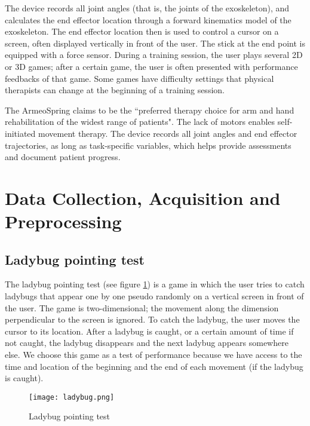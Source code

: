 The device records all joint angles (that is, the joints of the exoskeleton), and calculates the end effector location through a forward kinematics model of the exoskeleton. 
The end effector location then is used to control a cursor on a screen, often displayed vertically in front of the user. 
The stick at the end point is equipped with a force sensor. 
During a training session, the user plays several 2D or 3D games; after a certain game, the user is often presented with performance feedbacks of that game.
Some games have difficulty settings that physical therapists can change at the beginning of a training session.

The ArmeoSpring claims to be the ``preferred therapy choice for arm and hand rehabilitation of the widest range of patients"\footnotemark[\ref{aowebsite}]. 
The lack of motors enables self-initiated movement therapy. 
The device records all joint angles and end effector trajectories, as long as task-specific variables, which helps provide assessments and document patient progress.

\section{Data Collection, Acquisition and Preprocessing}
\label{datacollect}

\subsection{Ladybug pointing test}

The ladybug pointing test (see figure \ref{fig:ladybug}) is a game in which the user tries to catch ladybugs that appear one by one pseudo randomly on a vertical screen in front of the user. 
The game is two-dimensional; the movement along the dimension perpendicular to the screen is ignored. 
To catch the ladybug, the user moves the cursor to its location. After a ladybug is caught, or a certain amount of time if not caught, the ladybug disappears and the next ladybug appears somewhere else. 
We choose this game as a test of performance because we have access to the time and location of the beginning and the end of each movement (if the ladybug is caught).%

\begin{figure}
	\texttt{[image: ladybug.png]}
	\centering
	\caption{Ladybug pointing test}
	\label{fig:ladybug}
\end{figure}

